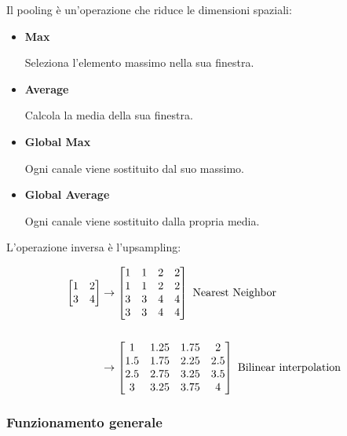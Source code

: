 \documentclass{article}
\begin{document}
Il pooling è un'operazione che riduce le dimensioni spaziali:

\begin{itemize}

\item \textbf{Max}

Seleziona l'elemento massimo nella sua finestra.

\item \textbf{Average}

Calcola la media della sua finestra.

\item \textbf{Global Max}

Ogni canale viene sostituito dal suo massimo.

\item \textbf{Global Average}

Ogni canale viene sostituito dalla propria media.\newline

\end{itemize}

L'operazione inversa è l'upsampling:

\begin{align*}
\begin{bmatrix}
    1 & 2\\
    3 & 4
\end{bmatrix}
&\rightarrow
\begin{bmatrix}
    1 & 1 & 2 & 2\\
    1 & 1 & 2 & 2\\
    3 & 3 & 4 & 4\\
    3 & 3 & 4 & 4\\
\end{bmatrix}\text{ Nearest Neighbor}\\
\\
&\rightarrow
\begin{bmatrix}
    1 & 1.25 & 1.75 & 2\\
    1.5 & 1.75 & 2.25 & 2.5\\
    2.5 & 2.75 & 3.25 & 3.5\\
    3 & 3.25 & 3.75 & 4\\
\end{bmatrix}\text{ Bilinear interpolation}\newline
\end{align*}

\newpage

\subsubsection{Funzionamento generale}
\end{document}
